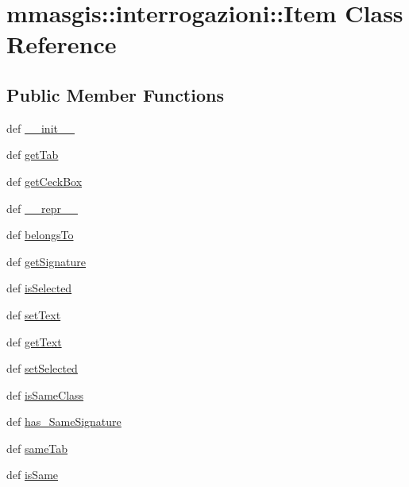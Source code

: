 \hypertarget{classmmasgis_1_1interrogazioni_1_1Item}{
\section{mmasgis::interrogazioni::Item Class Reference}
\label{classmmasgis_1_1interrogazioni_1_1Item}
}
\subsection*{Public Member Functions}
\begin{DoxyCompactItemize}
\item 
def \hyperlink{classmmasgis_1_1interrogazioni_1_1Item_a6797af77310dfaf96553b87ddc46da77}{\_\-\_\-init\_\-\_\-}
\item 
def \hyperlink{classmmasgis_1_1interrogazioni_1_1Item_a67f10408a6827f2c413ef540443c0ce6}{getTab}
\item 
def \hyperlink{classmmasgis_1_1interrogazioni_1_1Item_a4fb28434bcfd8dccfa3003ad64f3e1e0}{getCeckBox}
\item 
def \hyperlink{classmmasgis_1_1interrogazioni_1_1Item_a4edfe1ede827bf5aacb55cdbd8b4d37d}{\_\-\_\-repr\_\-\_\-}
\item 
def \hyperlink{classmmasgis_1_1interrogazioni_1_1Item_a941a564cecda1b0c709014ad84337e61}{belongsTo}
\item 
def \hyperlink{classmmasgis_1_1interrogazioni_1_1Item_ad191d89644c0a476ed3d50a043303803}{getSignature}
\item 
def \hyperlink{classmmasgis_1_1interrogazioni_1_1Item_a0fe4af29623b5fe214bea25902b1d76f}{isSelected}
\item 
def \hyperlink{classmmasgis_1_1interrogazioni_1_1Item_aaf6b92626bbd9139437e423e01f921c0}{setText}
\item 
def \hyperlink{classmmasgis_1_1interrogazioni_1_1Item_a18955d753819929685217192bf81cb12}{getText}
\item 
def \hyperlink{classmmasgis_1_1interrogazioni_1_1Item_a0e1351e91fe3fe2fb088016c29f74bcc}{setSelected}
\item 
def \hyperlink{classmmasgis_1_1interrogazioni_1_1Item_ae873a6d86ef3fda987ff0251e854d4de}{isSameClass}
\item 
def \hyperlink{classmmasgis_1_1interrogazioni_1_1Item_a384fe36ec392565f43301ec2759d2709}{has\_\-SameSignature}
\item 
def \hyperlink{classmmasgis_1_1interrogazioni_1_1Item_a657c13ff7881ad38dbde2ae5ebec033c}{sameTab}
\item 
def \hyperlink{classmmasgis_1_1interrogazioni_1_1Item_a247146dbc4673839a2f72faedbd13677}{isSame}
\end{DoxyCompactItemize}
